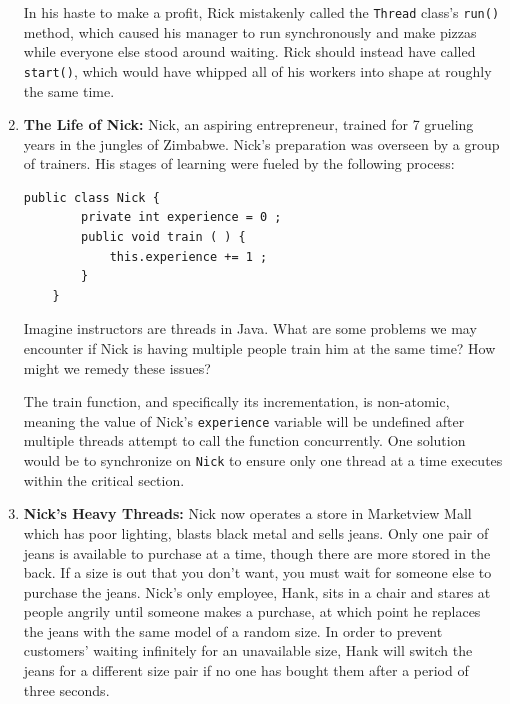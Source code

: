 \documentclass[11pt]{article}
\newenvironment{answer}{\large\lstset{basicstyle=\tiny\ttfamily}\color{white}}{}
\newenvironment{answer}{\large\lstset{basicstyle=\large\ttfamily}\color{red}}{}
\begin{document}
\begin{enumerate}
	\begin{answer}
	In his haste to make a profit, Rick mistakenly called the \texttt{Thread} class's \texttt{run()} method, which caused his manager to run synchronously and make pizzas while everyone else stood around waiting.
	Rick should instead have called \texttt{start()}, which would have whipped all of his workers into shape at roughly the same time.
	\end{answer}

\item {\bf The Life of Nick:} %
    Nick, an aspiring entrepreneur, trained for 7 grueling years in the jungles of Zimbabwe.
    Nick's preparation was overseen by a group of trainers. His stages of learning were
    fueled by the following process:
    \begin{lstlisting}[numbers=none]
    public class Nick {
        private int experience = 0 ;
        public void train ( ) {
            this.experience += 1 ;
        }
    }\end{lstlisting}Imagine instructors are threads in Java. What are some problems
    we may encounter if Nick is having multiple people train him at the same time?
    How might we remedy these issues?

    \begin{answer}
    The train function, and specifically its incrementation, is non-atomic, meaning the value of Nick's 
    \texttt{experience} variable will be undefined after multiple threads attempt to call the function concurrently.  One solution would be to synchronize on \texttt{Nick} to ensure only one thread at a time executes within the critical section.\\
    \end{answer}

\pagebreak
\item {\bf Nick's Heavy Threads:} Nick now operates a store in Marketview Mall which
      has poor lighting, blasts black metal and sells jeans. Only one pair of
      jeans is available to purchase at a time, though there are more
      stored in the back. If a size is out that you don't want, you must wait
      for someone else to purchase the jeans. Nick's only employee, Hank, sits
      in a chair and stares at people angrily until someone makes a purchase,
      at which point he replaces the jeans with the same model of a random
      size. In order to prevent customers' waiting infinitely for an
      unavailable size, Hank will switch the jeans for a different size pair if
      no one has bought them after a period of three seconds.


\end{enumerate}
\end{document}
